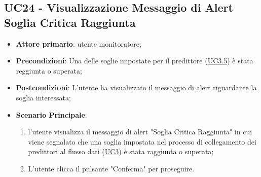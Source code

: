 
\label{par:UC24}
	\subsection{UC24 - Visualizzazione Messaggio di Alert Soglia Critica Raggiunta}
		\begin{itemize}
			\item\textbf{Attore primario}: utente monitoratore;
			\item\textbf{Precondizioni}: Una delle soglie impostate per il predittore (\hyperref[par:UC3.5]{UC3.5}) è stata reggiunta o superata;
			\item\textbf{Postcondizioni}: L’utente ha visualizzato il messaggio di alert riguardante la soglia interessata;
			\item\textbf{Scenario Principale}: 
				\begin{enumerate} 
					\item l’utente visualizza il messaggio di alert "Soglia Critica Raggiunta" in cui viene segnalato che una soglia impostata nel processo di collegamento dei predittori al flusso dati (\hyperref[par:UC3]{UC3}) è stata raggiunta o superata;
					\item L'utente clicca il pulsante "Conferma" per proseguire.		
				\end{enumerate}		
		\end{itemize}
	




